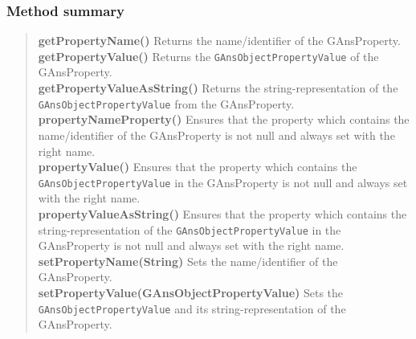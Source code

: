 {{{{{{{{{{\subsubsection{Method summary}{
\begin{verse}
{\bf getPropertyName()} Returns the name/identifier of the GAnsProperty.\\
{\bf getPropertyValue()} Returns the \texttt{\small GAnsObjectPropertyValue}{\small 
{}} of the GAnsProperty.\\
{\bf getPropertyValueAsString()} Returns the string-representation of the \texttt{\small GAnsObjectPropertyValue}{\small 
{}} from the GAnsProperty.\\
{\bf propertyNameProperty()} Ensures that the property which contains the name/identifier of the GAnsProperty is not null and always set with the right name.\\
{\bf propertyValue()} Ensures that the property which contains the \texttt{\small GAnsObjectPropertyValue}{\small 
{}} in the GAnsProperty is not null and always set with the right name.\\
{\bf propertyValueAsString()} Ensures that the property which contains the string-representation of the \texttt{\small GAnsObjectPropertyValue}{\small 
{}} in the GAnsProperty is not null and always set with the right name.\\
{\bf setPropertyName(String)} Sets the name/identifier of the GAnsProperty.\\
{\bf setPropertyValue(GAnsObjectPropertyValue)} Sets the \texttt{\small GAnsObjectPropertyValue}{\small 
{}} and its string-representation of the GAnsProperty.\\
\end{verse}
}
}}}}}}}}}}
